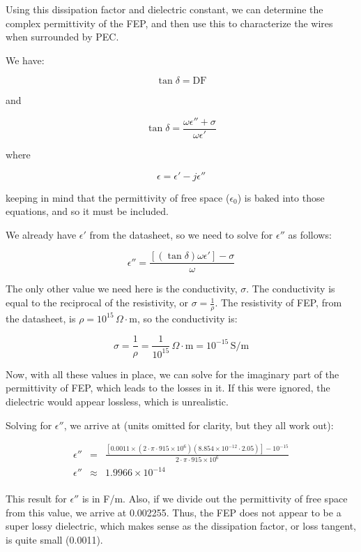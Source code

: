\documentclass[12pt,onecolumn,titlepage]{article}
\begin{document}
Using this dissipation factor and dielectric constant, we can determine the complex permittivity of the FEP, and then use this to characterize the wires when surrounded by PEC.

We have:

\[ \tan \delta = \text{DF} \]

and 

\[\tan \delta = \frac{\omega \epsilon'' + \sigma}{\omega \epsilon'} \]

where

\[\epsilon = \epsilon' - j \epsilon'' \]

keeping in mind that the permittivity of free space ($\epsilon_0$) is baked into those equations, and so it must be included.

We already have $\epsilon'$ from the datasheet, so we need to solve for $\epsilon''$ as follows:

\[ \epsilon'' = \frac{ \left[ \left( \tan \delta \right) \omega \epsilon' \right] - \sigma}{\omega} \]

The only other value we need here is the conductivity, $\sigma$. The conductivity is equal to the reciprocal of the resistivity, or $\sigma = \frac{1}{\rho}$. The resistivity of FEP, from the datasheet, is $\rho = 10^{15} \, \Omega \cdot \text{m}$, so the conductivity is:

\[ \sigma = \frac{1}{\rho} = \frac{1}{10^{15}} \, \Omega \cdot \text{m} = 10^{-15} \, \text{S/m} \]

Now, with all these values in place, we can solve for the imaginary part of the permittivity of FEP, which leads to the losses in it. If this were ignored, the dielectric would appear lossless, which is unrealistic. 

Solving for $\epsilon''$, we arrive at (units omitted for clarity, but they all work out):

\begin{eqnarray*}
\epsilon'' &=& \frac{ \left[ 0.0011 \times \left( 2 \cdot \pi \cdot 915 \times 10^6 \right) \left( 8.854 \times 10^{-12} \cdot 2.05 \right) \right] - 10^{-15} }{2 \cdot \pi \cdot 915 \times 10^6} \\
\epsilon'' &\approx& 1.9966 \times 10^{-14} \\
\end{eqnarray*}

This result for $\epsilon''$ is in F/m. Also, if we divide out the permittivity of free space from this value, we arrive at 0.002255. Thus, the FEP does not appear to be a super lossy dielectric, which makes sense as the dissipation factor, or loss tangent, is quite small (0.0011).
\end{document}

